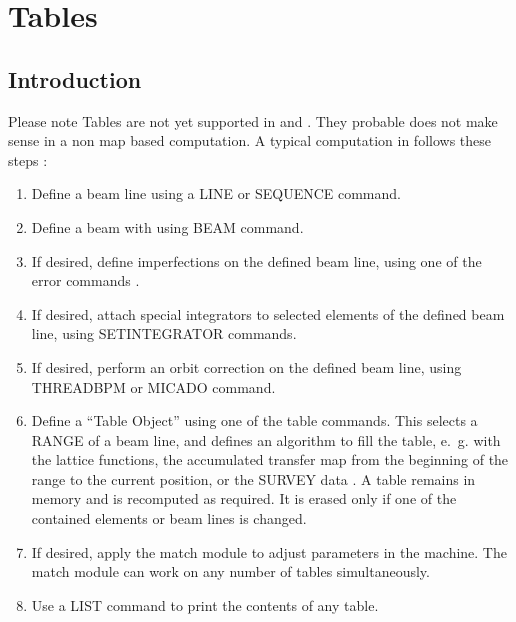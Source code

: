 %
%

\chapter{Tables}
\label{chp:tables}

\section{Introduction}
\label{sec:tabintro}

Please note Tables are not yet supported in \noopalt and \noopalcycl. They probable does not make sense in a non map based computation.  A typical computation in \opal  follows these steps :

\begin{enumerate}
\item
  Define a beam line using a {LINE} 
  or {SEQUENCE}  command.
\item
  Define a beam with using {BEAM}  command.
\item
  If desired, define imperfections on the defined beam line,
  using one of the error commands .
\item
  If desired, attach special integrators to selected elements of the
  defined beam line,
  using {SETINTEGRATOR}  commands.
\item
  If desired, perform an orbit correction on the defined beam line,
  using {THREADBPM}  or
  {MICADO}  command.
\item
  Define a ``Table Object'' using one of the table  commands.
  This selects a {RANGE}  of a beam line,
  and defines an algorithm to fill the table,
  e.~g. with the lattice functions,
  the accumulated transfer map from the beginning of the range to the
  current position, or the {SURVEY} data .
  A table remains in memory and is recomputed as required.
  It is erased only if one of the contained elements or beam lines is changed.
\item
  If desired, apply the match module  to adjust parameters
  in the machine. The match module can work on any number of tables
  simultaneously.
\item
  Use a {LIST}  command to print the contents of any
  table.
\end{enumerate}

